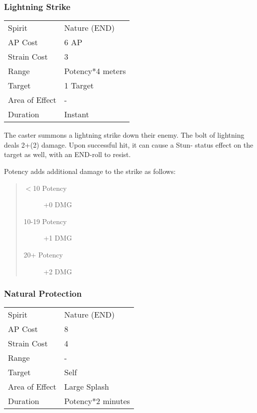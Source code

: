 \documentclass[11pt,a4paper,twocolumn]{book}
\begin{document}
\subsubsection*{Lightning Strike}
{
	\begin{tabu} to 70mm{| X[l,4] | X[l,7] |}
		\hline
		Spirit         & Nature (END)          \\
		AP Cost        & 6 AP                  \\
		Strain Cost    & 3                     \\
		Range          & Potency*4 meters \\
		Target         & 1 Target              \\
		Area of Effect & -                     \\
		Duration       & Instant               \\ \hline
	\end{tabu}
	
}
\medskip

The caster summons a lightning strike down their enemy. The bolt of lightning deals 2+(2) damage. Upon successful hit, it can cause a Stun- status effect on the target as well, with an END-roll to resist.

Potency adds additional damage to the strike as follows:
\begin{quote}
	\begin{description}
		\item[$<$10 Potency] 	+0 DMG
		\item[10-19 Potency] 	+1 DMG
		\item[20+ Potency]  	+2 DMG
	\end{description}	
\end{quote}

\subsubsection*{Natural Protection}
{
	\begin{tabu} to 70mm{| X[l,4] | X[l,7] |}
		\hline
		Spirit         & Nature (END)      \\
		AP Cost        & 8                 \\
		Strain Cost    & 4                 \\
		Range          & -                 \\
		Target         & Self              \\
		Area of Effect & Large Splash      \\
		Duration       & Potency*2 minutes \\ \hline
	\end{tabu}
	
}
\medskip
\end{document}
